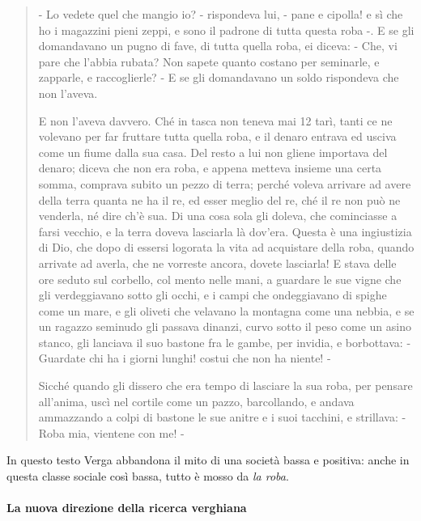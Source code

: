\documentclass{book}
\newcounter{mar}
\begin{document}
\begin{quote}
  - Lo vedete quel che mangio io? - rispondeva lui, - pane e cipolla! e sì che ho i magazzini pieni zeppi, e sono il padrone di tutta questa roba -. E se gli domandavano un pugno di fave, di tutta quella roba, ei diceva: - Che, vi pare che l'abbia rubata? Non sapete quanto costano per seminarle, e zapparle, e raccoglierle? - E se gli domandavano un soldo rispondeva che non l'aveva.
  
  E non l'aveva davvero. Ché in tasca non teneva mai 12 tarì, tanti ce ne volevano per far fruttare tutta quella roba, e il denaro entrava ed usciva come un fiume dalla sua casa. Del resto a lui non gliene importava del denaro; diceva che non era roba, e appena metteva insieme una certa somma, comprava subito un pezzo di terra; perché voleva arrivare ad avere della terra quanta ne ha il re, ed esser meglio del re, ché il re non può ne venderla, né dire ch'è sua.
  Di una cosa sola gli doleva, che cominciasse a farsi vecchio, e la terra doveva lasciarla là dov'era. Questa è una ingiustizia di Dio, che dopo di essersi logorata la vita ad acquistare della roba, quando arrivate ad averla, che ne vorreste ancora, dovete lasciarla! E stava delle ore seduto sul corbello, col mento nelle mani, a guardare le sue vigne che gli verdeggiavano sotto gli occhi, e i campi che ondeggiavano di spighe come un mare, e gli oliveti che velavano la montagna come una nebbia, e se un ragazzo seminudo gli passava dinanzi, curvo sotto il peso come un asino stanco, gli lanciava il suo bastone fra le gambe, per invidia, e borbottava: - Guardate chi ha i giorni lunghi! costui che non ha niente! -
  
  Sicché quando gli dissero che era tempo di lasciare la sua roba, per pensare all'anima, uscì nel cortile come un pazzo, barcollando, e andava ammazzando a colpi di bastone le sue anitre e i suoi tacchini, e strillava: - Roba mia, vientene con me! -
\end{quote}

In questo testo Verga abbandona il mito di una società bassa e positiva:
anche in questa classe sociale così bassa, tutto è mosso da \emph{la
roba}.

\paragraph{La nuova direzione della ricerca verghiana}
\end{document}
